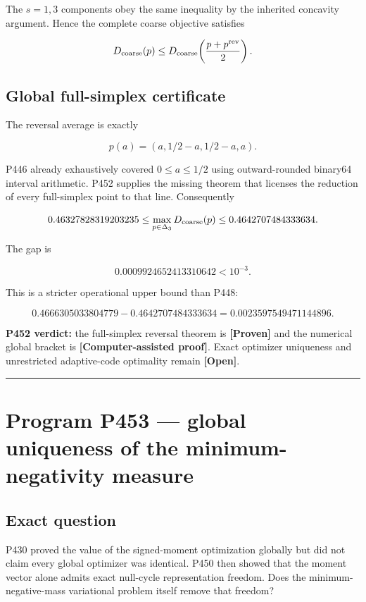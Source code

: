 \documentclass[11pt,a4paper,openany]{report}
\newcommand{\statusProven}{\textcolor{fingreen}{[Proven]}}
\begin{document}
The \(s=1,3\) components obey the same inequality by the inherited concavity argument. Hence the complete coarse objective satisfies

\[
D_{\rm coarse}(p)\le
D_{\rm coarse}\!\left(\frac{p+p^{\rm rev}}2\right).
\]

\section{Global full-simplex certificate}

The reversal average is exactly

\[
p(a)=(a,1/2-a,1/2-a,a).
\]

P446 already exhaustively covered \(0\le a\le1/2\) using outward-rounded binary64 interval arithmetic. P452 supplies the missing theorem that licenses the reduction of every full-simplex point to that line. Consequently

\[
0.46327828319203235
\le \max_{p\in\Delta_3}D_{\rm coarse}(p)
\le0.4642707484333634.
\]

The gap is

\[
0.0009924652413310642<10^{-3}.
\]

This is a stricter operational upper bound than P448:

\[
0.4666305033804779-0.4642707484333634
=0.0023597549471144896.
\]

\textbf{P452 verdict:} the full-simplex reversal theorem is \textbf{\statusProven{}} and the numerical global bracket is \textbf{\textcolor{fingreen}{[Computer-assisted proof]}}. Exact optimizer uniqueness and unrestricted adaptive-code optimality remain \textbf{\textcolor{finorange}{[Open]}}.

\par\medskip\hrule\medskip

\chapter{Program P453 --- global uniqueness of the minimum-negativity measure}

\section{Exact question}

P430 proved the value of the signed-moment optimization globally but did not claim every global optimizer was identical. P450 then showed that the moment vector alone admits exact null-cycle representation freedom. Does the minimum-negative-mass variational problem itself remove that freedom?
\end{document}
